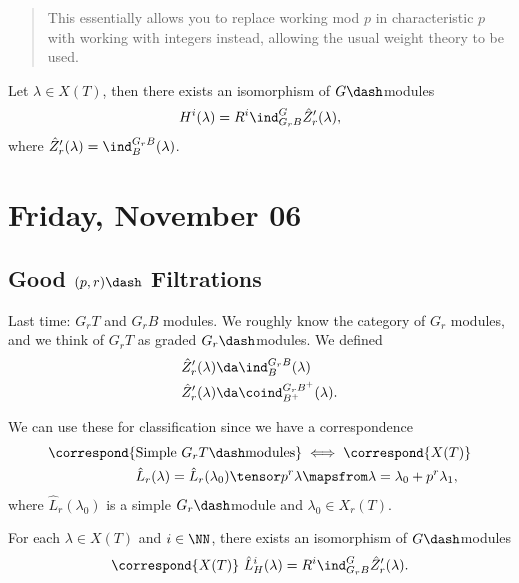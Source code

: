 \begin{quote}
This essentially allows you to replace working mod \(p\) in
characteristic \(p\) with working with integers instead, allowing the
usual weight theory to be used.
\end{quote}

\begin{proposition}[?]

Let \(\lambda \in X(T)\), then there exists an isomorphism of
\(G\dash\)modules
\begin{align*}  
H^i(\lambda) = R^i \ind_{G_r B}^G \hat{Z}_r ' (\lambda)
,\end{align*} where \(\hat{Z}_r'(\lambda) = \ind_B^{G_r B}(\lambda)\).

\end{proposition}

\hypertarget{friday-november-06}{%
\section{Friday, November 06}\label{friday-november-06}}

\hypertarget{good-p-rdash-filtrations}{%
\subsection{\texorpdfstring{Good \((p, r)\dash\)
Filtrations}{Good (p, r)\textbackslash dash Filtrations}}\label{good-p-rdash-filtrations}}

Last time: \(G_r T\) and \(G_r B\) modules. We roughly know the category
of \(G_r\) modules, and we think of \(G_r T\) as graded
\(G_r\dash\)modules. We defined
\begin{align*}  
\hat{Z}_r' (\lambda) &\da \ind_{B}^{G_r B}(\lambda) \\
\hat{Z}_r' (\lambda) &\da \coind_{B^+}^{G_r B^+}(\lambda)
.\end{align*}

We can use these for classification since we have a correspondence
\begin{align*}  
\correspond{\text{Simple }G_rT\dash\text{modules}}
&\iff
\correspond{X(T)} \\
\hat{L}_r(\lambda) = \hat{L}_r(\lambda_0) \tensor p^r \lambda &\mapsfrom \lambda = \lambda_0 + p^r \lambda_1
,\end{align*} where \(\hat{L}_r(\lambda_0)\) is a simple
\(G_r\dash\)module and \(\lambda_0 \in X_r(T)\).

\begin{proposition}[?]

For each \(\lambda\in X(T)\) and \(i\in \NN\), there exists an
isomorphism of \(G\dash\)modules
\begin{align*}  \correspond{X(T)} \ \hat{L}_
H^i(\lambda) = R^i \ind_{G_r B}^G \hat{Z}_r'( \lambda  )
.\end{align*}

\end{proposition}

